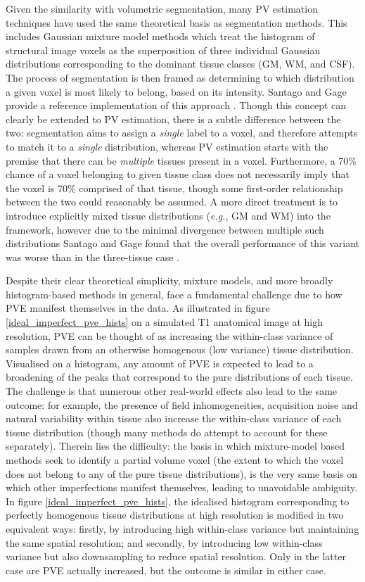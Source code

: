 Given the similarity with volumetric segmentation, many PV estimation techniques have used the same theoretical basis as segmentation methods. This includes Gaussian mixture model methods which treat the histogram of structural image voxels as the superposition of three individual Gaussian distributions corresponding to the dominant tissue classes (GM, WM, and CSF). The process of segmentation is then framed as determining to which distribution a given voxel is most likely to belong, based on its intensity. Santago and Gage provide a reference implementation of this approach \cite{Santago1993}. Though this concept can clearly be extended to PV estimation, there is a subtle difference between the two: segmentation aims to assign a \textit{single} label to a voxel, and therefore attempts to match it to a \textit{single} distribution, whereas PV estimation starts with the premise that there can be \textit{multiple} tissues present in a voxel. Furthermore, a 70\% chance of a voxel belonging to given tissue class does not necessarily imply that the voxel is 70\% comprised of that tissue, though some first-order relationship between the two could reasonably be assumed. A more direct treatment is to introduce explicitly mixed tissue distributions (\textit{e.g.}, GM and WM) into the framework, however due to the minimal divergence between multiple such distributions Santago and Gage found that the overall performance of this variant was worse than in the three-tissue case \cite{Santago1993}.

Despite their clear theoretical simplicity, mixture models, and more broadly histogram-based methods in general, face a fundamental challenge due to how PVE manifest themselves in the data. As illustrated in figure \ref{ideal_imperfect_pve_hists} on a simulated T1 anatomical image at high resolution, PVE can be thought of as increasing the within-class variance of samples drawn from an otherwise homogenous (low variance) tissue distribution. Visualised on a histogram, any amount of PVE is expected to lead to a broadening of the peaks that correspond to the pure distributions of each tissue. The challenge is that numerous other real-world effects also lead to the same outcome: for example, the presence of field inhomogeneities, acquisition noise and natural variability within tissue also increase the within-class variance of each tissue distribution (though many methods do attempt to account for these separately). Therein lies the difficulty: the basis in which mixture-model based methods seek to identify a partial volume voxel (the extent to which the voxel does not belong to any of the pure tissue distributions), is the very same basis on which other imperfections manifest themselves, leading to unavoidable ambiguity. In figure \ref{ideal_imperfect_pve_hists}, the idealised histogram corresponding to perfectly homogenous tissue distributions at high resolution is modified in two equivalent ways: firstly, by introducing high within-class variance but maintaining the same spatial resolution; and secondly, by introducing low within-class variance but also downsampling to reduce spatial resolution. Only in the latter case are PVE actually increased, but the outcome is similar in either case. 


